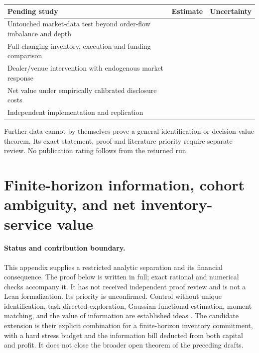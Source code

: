 \begin{center}\small
\begin{tabular}{p{}cc}
\toprule
Pending study & Estimate & Uncertainty\\
\midrule
Untouched market-data test beyond order-flow imbalance and depth & & \\[1.8ex]
Full changing-inventory, execution and funding comparison & & \\[1.8ex]
Dealer/venue intervention with endogenous market response & & \\[1.8ex]
Net value under empirically calibrated disclosure costs & & \\[1.8ex]
Independent implementation and replication & & \\[1.8ex]
\bottomrule
\end{tabular}
\end{center}
\noindent Further data cannot by themselves prove a general identification or
decision-value theorem. Its exact statement, proof and literature priority
require separate review. No publication rating follows from the returned run.


\section*{Finite-horizon information, cohort ambiguity, and net inventory-service value}

\paragraph{Status and contribution boundary.}
This appendix supplies a restricted analytic separation and its financial
consequence. The proof below is written in full; exact rational and numerical
checks accompany it. It has not received independent proof review and is not
a Lean formalization. Its priority is unconfirmed. Control without unique
identification, task-directed exploration, Gaussian functional estimation,
moment matching, and the value of information are established ideas
\citep{fhc:waarde,fhc:wagenmaker,fhc:donoho,fhc:heinrich,fhc:blackwell}.
The candidate extension is their explicit combination for a finite-horizon
inventory commitment, with a hard stress budget and the information bill
deducted from both capital and profit. It does not close the broader open
theorem of the preceding drafts.

